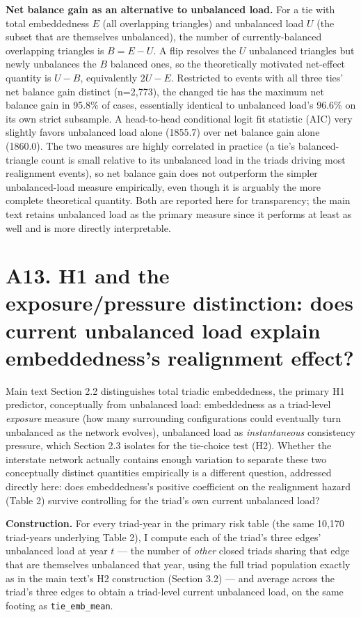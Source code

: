 \documentclass[Afour,sageh,times,doublespace]{sagej}
\begin{document}
\textbf{Net balance gain as an alternative to unbalanced load.} For a tie with total embeddedness $E$ (all overlapping triangles) and unbalanced load $U$ (the subset that are themselves unbalanced), the number of currently-balanced overlapping triangles is $B = E - U$. A flip resolves the $U$ unbalanced triangles but newly unbalances the $B$ balanced ones, so the theoretically motivated net-effect quantity is $U - B$, equivalently $2U - E$. Restricted to events with all three ties' net balance gain distinct (n=2,773), the changed tie has the maximum net balance gain in 95.8\% of cases, essentially identical to unbalanced load's 96.6\% on its own strict subsample. A head-to-head conditional logit fit statistic (AIC) very slightly favors unbalanced load alone (1855.7) over net balance gain alone (1860.0). The two measures are highly correlated in practice (a tie's balanced-triangle count is small relative to its unbalanced load in the triads driving most realignment events), so net balance gain does not outperform the simpler unbalanced-load measure empirically, even though it is arguably the more complete theoretical quantity. Both are reported here for transparency; the main text retains unbalanced load as the primary measure since it performs at least as well and is more directly interpretable.

\section*{A13. H1 and the exposure/pressure distinction: does current unbalanced load explain embeddedness's realignment effect?}

Main text Section 2.2 distinguishes total triadic embeddedness, the primary H1 predictor, conceptually from unbalanced load: embeddedness as a triad-level \emph{exposure} measure (how many surrounding configurations could eventually turn unbalanced as the network evolves), unbalanced load as \emph{instantaneous} consistency pressure, which Section 2.3 isolates for the tie-choice test (H2). Whether the interstate network actually contains enough variation to separate these two conceptually distinct quantities empirically is a different question, addressed directly here: does embeddedness's positive coefficient on the realignment hazard (Table 2) survive controlling for the triad's own current unbalanced load?

\textbf{Construction.} For every triad-year in the primary risk table (the same 10,170 triad-years underlying Table 2), I compute each of the triad's three edges' unbalanced load at year $t$ --- the number of \emph{other} closed triads sharing that edge that are themselves unbalanced that year, using the full triad population exactly as in the main text's H2 construction (Section 3.2) --- and average across the triad's three edges to obtain a triad-level current unbalanced load, on the same footing as \texttt{tie\_emb\_mean}.
\end{document}
